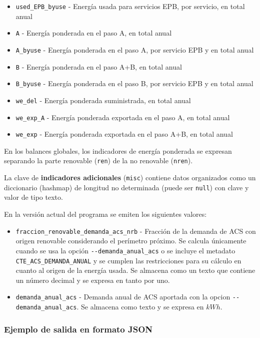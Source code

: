 \documentclass[10pt,notitlepage,oneside,a4paper]{article}
\begin{document}
\begin{itemize}
\item \texttt{used\_EPB\_byuse} - Energía usada para servicios EPB, por servicio, en total anual
\item \texttt{A} - Energía ponderada en el paso A, en total anual
\item \texttt{A\_byuse} - Energía ponderada en el paso A, por servicio EPB y en total anual
\item \texttt{B} - Energía ponderada en el paso A+B, en total anual
\item \texttt{B\_byuse} - Energía ponderada en el paso B, por servicio EPB y en total anual
\item \texttt{we\_del} - Energía ponderada suministrada, en total anual
\item \texttt{we\_exp\_A} - Energía ponderada exportada en el paso A, en total anual
\item \texttt{we\_exp} - Energía ponderada exportada en el paso A+B, en total anual
\end{itemize}

En los balances globales, los indicadores de energía ponderada se expresan separando la parte renovable (\texttt{ren}) de la no renovable (\texttt{nren}).

La clave de \textbf{indicadores adicionales} (\texttt{misc}) contiene datos organizados como un diccionario (hashmap) de longitud no determinada (puede ser \texttt{null}) con clave y valor de tipo texto.

En la versión actual del programa se emiten los siguientes valores:

\begin{itemize}
\item \texttt{fraccion\_renovable\_demanda\_acs\_nrb} - Fracción de la demanda de ACS con origen renovable considerando el perímetro próximo. Se calcula únicamente cuando se usa la opción \texttt{-{}-demanda\_anual\_acs} o se incluye el metadato \texttt{CTE\_ACS\_DEMANDA\_ANUAL} y se cumplen las restricciones para su cálculo en cuanto al origen de la energía usada. Se almacena como un texto que contiene un número decimal y se expresa en tanto por uno.
\item \texttt{demanda\_anual\_acs} - Demanda anual de ACS aportada con la opcion \texttt{-{}-demanda\_anual\_acs}. Se almacena como texto y se expresa en $kWh$.
\end{itemize}

\subsubsection{Ejemplo de salida en formato JSON}
\end{document}
